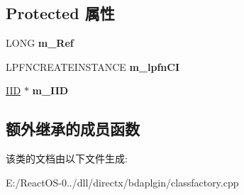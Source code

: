 \subsection*{Protected 属性}
\begin{DoxyCompactItemize}
\item 
\mbox{\label{class_c_class_factory_a974762c9a77b191a637405ddd3e5a873}} 
L\+O\+NG {\bfseries m\+\_\+\+Ref}
\item 
\mbox{\label{class_c_class_factory_a1a8abceac92bb3866e7fdd4f669e401e}} 
L\+P\+F\+N\+C\+R\+E\+A\+T\+E\+I\+N\+S\+T\+A\+N\+CE {\bfseries m\+\_\+lpfn\+CI}
\item 
\mbox{\label{class_c_class_factory_a296a5e103c80666c1ba345584bff96bd}} 
\hyperlink{struct___i_i_d}{I\+ID} $\ast$ {\bfseries m\+\_\+\+I\+ID}
\end{DoxyCompactItemize}
\subsection*{额外继承的成员函数}


该类的文档由以下文件生成\+:\begin{DoxyCompactItemize}
\item 
E\+:/\+React\+O\+S-\/0../dll/directx/bdaplgin/classfactory.\+cpp\end{DoxyCompactItemize}
